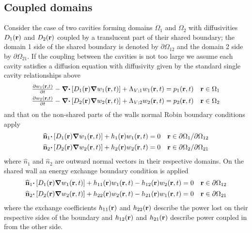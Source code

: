 \documentclass[a4paper]{article}
\numberwithin{equation}{section}
\begin{document}
\subsection[Coupled domains]{Coupled domains}
\label{sc:sum:coup}

Consider the case of two cavities forming domains $\Omega_1$ and $\Omega_2$ with
diffusivities $D_1\pr$ and $D_2\pr$ coupled by a translucent part of their 
shared boundary; the domain 1 side of the shared boundary is denoted by 
${\partial}\Omega_{12}$ and the domain 2 side by ${\partial}\Omega_{21}$.
If the coupling between the cavities is not too large we assume each cavity 
satisfies a diffusion equation with diffusivity given by the standard single 
cavity relationships above
\begin{align}
\begin{matrix}
\frac{{\partial}w_1\prt}{{\partial}t}-{\vnabla}{\vcdot}\left[D_1\pr{\vnabla}w_1\prt\right]+\Lambda_{V;1}w_1\prt = p_1\prt &\vr\in\Omega_1
\end{matrix} \\
\begin{matrix}
\frac{{\partial}w_2\prt}{{\partial}t}-{\vnabla}{\vcdot}\left[D_2\pr{\vnabla}w_2\prt\right]+\Lambda_{V;2}w_2\prt = p_2\prt &\vr\in\Omega_2
\end{matrix}
\end{align}
and that on the non-shared parts of the walls normal Robin boundary conditions
apply
\begin{align}
\begin{matrix}
\uvn_1{\vcdot}\left[D_1\pr{\vnabla}w_1\prt\right]+h_1\pr w_1\prt = 0 &\vr\in\partial\Omega_1/\partial\Omega_{12}
\end{matrix}\\
\begin{matrix}
\uvn_2{\vcdot}\left[D_2\pr{\vnabla}w_2\prt\right]+h_2\pr w_2\prt = 0 &\vr\in\partial\Omega_2/\partial\Omega_{21}
\end{matrix}
\end{align}
where  $\widehat  n_1$ and  $\widehat  n_2$ are outward normal vectors in their
respective domains. On the shared wall an energy exchange boundary condition is
applied~\citep{Billon2008}
\begin{align}
\begin{matrix}
\uvn_1{\vcdot}\left[D_1\pr{\vnabla}w_1\prt\right]+h_{11}\pr w_1\prt-h_{12}\pr w_2\prt = 0 &\vr\in\partial\Omega_{12}
\end{matrix}\\
\begin{matrix}
\uvn_2{\vcdot}\left[D_2\pr{\vnabla}w_2\prt\right]+h_{22}\pr w_2\prt-h_{21}\pr w_1\prt = 0 &\vr\in\partial\Omega_{21}
\end{matrix}
\end{align}
where the exchange coefficients $h_{11}\pr$ and $h_{22}\pr$ describe the power lost 
on their respective sides of the boundary and $h_{12}\pr$ and $h_{21}\pr$ describe power
coupled in from the other side.
\end{document}
